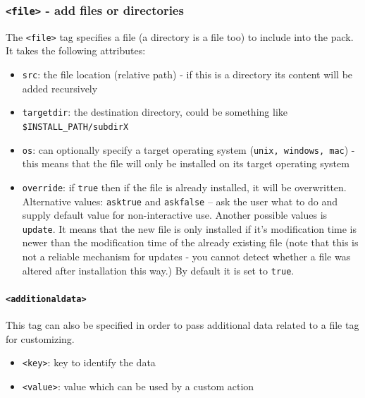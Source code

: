 \subsubsection{\label{tag:file}\texttt{<file>} - add files or directories}

The \texttt{<file>} tag specifies a file (a directory is a file too) to 
include into the pack. It takes the following attributes:

\begin{itemize}

  \item \texttt{src}: the file location (relative path) - if this is a
  directory its content will be added recursively

  \item \texttt{targetdir}: the destination directory, could be something like
  \texttt{\$INSTALL\_PATH/subdirX}

  \item \texttt{os}: can optionally specify a target operating system
  (\texttt{unix, windows, mac}) - this means that the file will only be
  installed on its target operating system

  \item \texttt{override}: if \texttt{true} then if the file is already
  installed, it will be overwritten. Alternative values: \texttt{asktrue} and
  \texttt{askfalse} -- ask the user what to do and supply default value for
  non-interactive use. Another possible values is \texttt{update}. It means
  that the new file is only installed if it's modification time is newer than
  the modification time of the already existing file (note that this is not a
  reliable mechanism for updates - you cannot detect whether a file was
  altered after installation this way.) By default it is set to \texttt{true}.

\end{itemize}
\paragraph{\label{tag:additionaldata}\texttt{<additionaldata>}}

This tag can also be specified in order to pass additional data
related to a file tag for customizing.

\begin{itemize}

  \item \texttt{<key>}: key to identify the data
  \item \texttt{<value>}: value which can be used by a custom
  action

\end{itemize}

